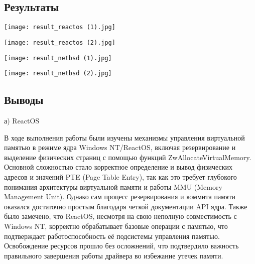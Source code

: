 \documentclass[a4paper, 14pt]{extarticle}
\begin{document}
\vspace{1em}
\begin{center}
\section{Результаты}

\begin{minipage}{\linewidth}
\vspace{50pt}
\centering
\texttt{[image: result\_reactos (1).jpg]}
\label{fig:result_reactos (1).jpg}
\end{minipage}

\begin{minipage}{\linewidth}
\vspace{20pt}
\centering
\texttt{[image: result\_reactos (2).jpg]}
\label{fig:result_reactos (2).jpg}
\end{minipage}

\begin{minipage}{\linewidth}
\vspace{50pt}
\centering
\texttt{[image: result\_netbsd (1).jpg]}
\label{fig:result_netbsd (1).jpg}
\end{minipage}

\begin{minipage}{\linewidth}
\vspace{50pt}
\centering
\texttt{[image: result\_netbsd (2).jpg]}
\label{fig:result_netbsd (2).jpg}
\end{minipage}

\end{center}

\newpage

\begin{center}
\section{Выводы}
а) ReactOS
\end{center} 
В ходе выполнения работы были изучены механизмы управления виртуальной памятью в режиме ядра Windows NT/ReactOS, включая резервирование и выделение физических страниц с помощью функций ZwAllocateVirtualMemory. Основной сложностью стало корректное определение и вывод физических адресов и значений PTE (Page Table Entry), так как это требует глубокого понимания архитектуры виртуальной памяти и работы MMU (Memory Management Unit). Однако сам процесс резервирования и коммита памяти оказался достаточно простым благодаря четкой документации API ядра. Также было замечено, что ReactOS, несмотря на свою неполную совместимость с Windows NT, корректно обрабатывает базовые операции с памятью, что подтверждает работоспособность её подсистемы управления памятью. Освобождение ресурсов прошло без осложнений, что подтвердило важность правильного завершения работы драйвера во избежание утечек памяти.
\end{document}
